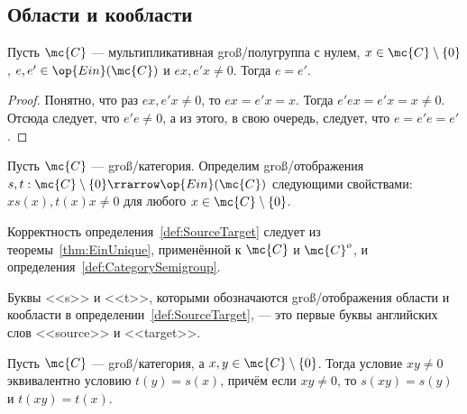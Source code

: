 \documentclass[
	extrafontsizes,
	11pt,
	hyphens,
]{memoir}
\begin{document}
\subsection{Области и кообласти}

\begin{theorem}
Пусть \(\mc{C}\) --- мультипликативная groß\-/полугруппа с нулем, \(x \in \mc{C} \setminus \{0\}\), \(e, e' \in \op{Ein}(\mc{C})\) и \(ex, e'x \neq 0\).%
\label{thm:EinUnique}
Тогда \(e = e'\).
\end{theorem}

\begin{proof}
Понятно, что раз \(ex, e'x \neq 0\), то \(ex = e'x = x\). Тогда \(e'ex = e'x = x \neq 0\). Отсюда следует, что \(e'e \neq 0\), а из этого, в свою очередь, следует, что \(e = e'e = e'\).
\end{proof}

\begin{definition}
Пусть \(\mc{C}\) --- groß\-/категория.%
\label{def:SourceTarget}
Оп\-ре\-де\-лим
groß\-/отображения \(s,t : \mc{C} \setminus \{0\} \rrarrow \op{Ein}(\mc{C})\) следующими свойствами: \(x s(x), t(x) x \neq 0\) для любого \(x \in \mc{C} \setminus \{0\}\).
\end{definition}

\begin{remark}
Корректность определения~\ref{def:SourceTarget} следует из теоремы~\ref{thm:EinUnique}, применённой к \(\mc{C}\) и \(\mc{C}^o\), и определения~\ref{def:CategorySemigroup}. 
\end{remark}

\begin{remark}
Буквы <<\textenglish{s}>> и <<\textenglish{t}>>, которыми обозначаются groß\-/отображения области и кообласти в определении~\ref{def:SourceTarget}, --- это первые буквы английских слов <<\textenglish{source}>> и <<\textenglish{target}>>.
\end{remark}

\begin{theorem}
Пусть \(\mc{C}\) --- groß\-/категория, а \(x, y \in \mc{C} \setminus \{0\}\). Тогда условие \(xy \neq 0\) эквивалентно условию \(t(y) = s(x)\), причём если \(xy \neq 0\), то \(s(xy) = s(y)\) и \(t(xy) = t(x)\).
\end{theorem}
\end{document}
